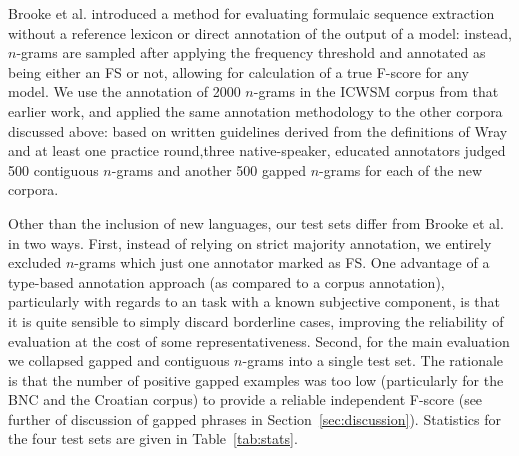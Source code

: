 \documentclass[11pt,letterpaper]{article}
\makeatletter
\def \al {al.\@ }
\newcommand{\tabref}[2][]{Table#1~\ref{#2}\xspace}
\newcommand{\secref}[2][]{Section#1~\ref{#2}\xspace}
\makeatother
\begin{document}
Brooke et \al {} introduced a method for evaluating formulaic sequence extraction without a reference lexicon or direct annotation of the output of a model: instead, $n$-grams are sampled after applying the frequency threshold and annotated as being either an FS or not, allowing for calculation of a true F-score for any model. We use the annotation of 2000 $n$-grams in the ICWSM corpus from that earlier work, and applied the same annotation methodology to the other corpora discussed above: based on written guidelines derived from the definitions of Wray \cite{Wray08} and at least one practice round,three native-speaker, educated annotators judged 500 contiguous $n$-grams and another 500 gapped $n$-grams for each of the new corpora. 

Other than the inclusion of new languages, our test sets differ from Brooke et \al {} in two ways. First, instead of relying on strict majority annotation, we entirely excluded $n$-grams which just one annotator marked as FS. One advantage of a type-based annotation approach (as compared to a corpus annotation), particularly with regards to an task with a known subjective component, is that it is quite sensible to simply discard borderline cases, improving the reliability of evaluation at the cost of some representativeness.  Second, for the main evaluation we collapsed gapped and contiguous $n$-grams into a single test set. The rationale is that the number of positive gapped examples was too low (particularly for the BNC and the Croatian corpus) to provide a reliable independent F-score (see further of discussion of gapped phrases in \secref{sec:discussion}). Statistics for the four test sets are given in \tabref{tab:stats}.
\end{document}
